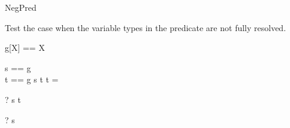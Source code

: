 \begin{zsection}
  \SECTION NegPred
\end{zsection}

Test the case when the variable types in the predicate are not fully 
resolved.
\begin{zed}
  g[X] == X
\end{zed}

\begin{axdef}
  s == g\\
  t == g
\where
  \lnot s \in t \land
  t = \power \nat
\end{axdef}

\begin{zed} \vdash? \lnot s \in t \end{zed}
\begin{zed} \vdash? s \in \power \nat \end{zed}
